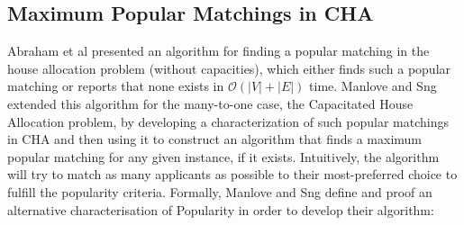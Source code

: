 \subsection{Maximum Popular Matchings in CHA}\label{algo-max-pop}
Abraham et al \cite{AbrahamPopular} presented an algorithm for finding a popular matching in the house allocation problem (without capacities), which either finds such a popular matching or reports that none exists in $\mathcal{O}(|V| + |E|)$ time. Manlove and Sng \cite{ManlovePopularMatchings} extended this algorithm for the many-to-one case, the Capacitated House Allocation problem, by developing a characterization of such popular matchings in CHA and then using it to construct an algorithm that finds a maximum popular matching for any given instance, if it exists. 
Intuitively, the algorithm will try to match as many applicants as possible to their most-preferred choice to fulfill the popularity criteria. Formally, Manlove and Sng \cite{ManlovePopularMatchings} define and proof an alternative characterisation of Popularity in order to develop their algorithm:

